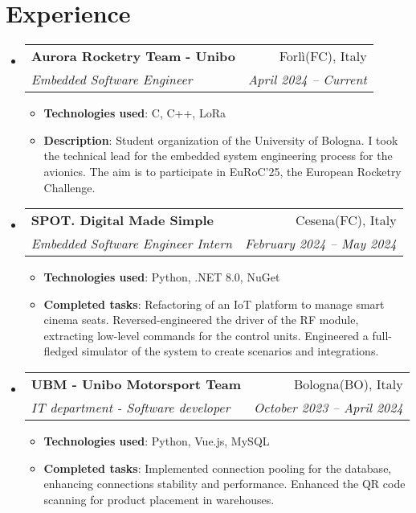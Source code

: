 \documentclass[letterpaper,11pt]{article}
\makeatletter
\newcommand{\resumeItem}[2]{
  \item\small{
    \textbf{#1}{: #2 \vspace{-2pt}}
  }
}
\newcommand{\resumeSubheading}[4]{
  \vspace{-1pt}\item
    \begin{tabular*}{0.97\textwidth}{l@{\extracolsep{\fill}}r}
      \textbf{#1} & #2 \\
      \textit{\small#3} & \textit{\small #4} \\
    \end{tabular*}\vspace{-5pt}
}
\newcommand{\resumeSubHeadingListStart}{\begin{itemize}[leftmargin=*]}
\newcommand{\resumeSubHeadingListEnd}{\end{itemize}}
\newcommand{\resumeItemListStart}{\begin{itemize}}
\newcommand{\resumeItemListEnd}{\end{itemize}\vspace{-5pt}}
\makeatother
\begin{document}
\section{Experience}
\resumeSubHeadingListStart
    \resumeSubheading{Aurora Rocketry Team - Unibo}{Forlì(FC), Italy}{Embedded Software Engineer}{April 2024 -- Current}
    \resumeItemListStart
        \resumeItem{Technologies used} {C, C++, LoRa}
        \resumeItem{Description}
        {Student organization of the University of Bologna.
	        I took the technical lead for the embedded system engineering process for the avionics.
	        The aim is to participate in EuRoC'25, the European Rocketry Challenge.}
    \resumeItemListEnd
    \resumeSubheading{SPOT. Digital Made Simple}{Cesena(FC), Italy}{Embedded Software Engineer Intern}{February 2024 -- May 2024}
    \resumeItemListStart
        \resumeItem{Technologies used} {Python, .NET 8.0, NuGet}
        \resumeItem{Completed tasks}
        {Refactoring of an IoT platform to manage smart cinema seats.
          Reversed-engineered the driver of the RF module, extracting low-level commands for the control units.
          Engineered a full-fledged simulator of the system to create scenarios and integrations.}
    \resumeItemListEnd
    \resumeSubheading{UBM - Unibo Motorsport Team}{Bologna(BO), Italy}{IT department - Software developer}{October 2023 -- April 2024}
    \resumeItemListStart
        \resumeItem{Technologies used} {Python, Vue.js, MySQL}
        \resumeItem{Completed tasks}
        {Implemented connection pooling for the database, enhancing connections stability and performance. Enhanced the QR code scanning for product placement in warehouses.}
    \resumeItemListEnd
\resumeSubHeadingListEnd

\begin{comment}    
    \resumeSubheading
      {UBM - Unibo Motorsport Team}{Bologna, Italy}
      {Software developer}{Oct. 2023 - Current}
      \resumeItemListStart
        \resumeItem{Python}
          {I improved the back-end of the application, implementing new features, 
            documenting the code and fixing bugs.
            In particular:}
            \resumeItemListStart
                \resumeItem{Connection pooling}
                    {I implemented a connection pool to the database, to avoid the overhead of creating a new connection every time a request is made.}
            \resumeItemListEnd
      \resumeItemListEnd

  
    \resumeSubheading
      {Other Company}{Location}
      {Position}{From - To}
      \resumeItemListStart
        \resumeItem{Technology you worked with/on}
          {Description}
        \resumeItem{Other technology you worked with/on}
          {Description}
      \resumeItemListEnd

    \resumeSubheading
      {Research Position}{Location}
      {Position}{From - To}
      \resumeItemListStart
        \resumeItem{Technology you worked with/on}
          {Description}
        \resumeItem{Other technology you worked with/on}
          {Description}
      \resumeItemListEnd
\end{comment}
\end{document}
